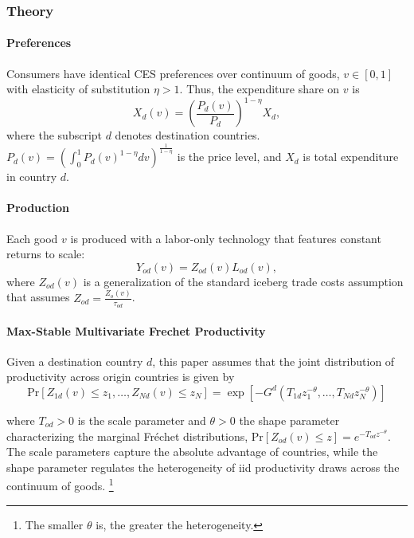 \subsubsection{Theory}
\paragraph{Preferences}
Consumers have identical CES preferences over continuum of goods, $v \in [0,1]$ 
with elasticity of substitution $\eta > 1$.
Thus, the expenditure share on $v$ is 
\begin{equation}
    X_d(v) = \left(\frac{P_d(v)}{P_d}\right)^{1-\eta} X_d,
\end{equation}
where the subscript $d$ denotes destination countries.
$P_d(v) = \left(\int_0^1 P_d(v)^{1-\eta} dv \right)^{\frac{1}{1-\eta}}$
is the price level, and $X_d$ is total expenditure in country $d$.

\paragraph{Production}
Each good $v$ is produced with a labor-only technology that features constant returns to scale:
\begin{equation}
\label{eqn:production_technology}
    Y_{od}(v) = Z_{od}(v)L_{od}(v),
\end{equation}
where $Z_{od}(v)$ is a generalization of the standard iceberg trade costs assumption 
that assumes $Z_{od} = \frac{Z_o(v)}{\tau_{od}}$.

\paragraph{Max-Stable Multivariate Frechet Productivity}
Given a destination country $d$,
this paper assumes that the joint distribution of productivity across 
origin countries is given by
\begin{equation}
    \text{Pr}\left[Z_{1 d}(v) \leq z_1, \ldots, Z_{N d}(v) \leq z_N\right]
    =
    \exp \left[-G^d\left(T_{1 d} z_1^{-\theta}, \ldots, T_{N d} z_N^{-\theta}\right)\right]    
\end{equation}

where $T_{o d}>0$ is the scale parameter and 
$\theta>0$ the shape parameter characterizing the marginal Fr\'{e}chet distributions, 
$\text{Pr}\left[Z_{o d}(v) \leq z\right]=e^{-T_{o d} z^{-\theta}}$. 
The scale parameters capture the absolute advantage of countries, 
while the shape parameter regulates the heterogeneity of iid productivity draws across the continuum of goods.%
\footnote{
    The smaller $\theta$ is, the greater the heterogeneity.
}

